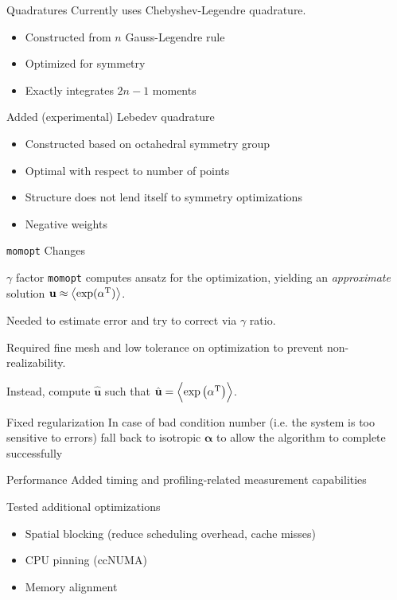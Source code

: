 \documentclass{beamer}
\renewcommand{\vec}[1]{\ensuremath{\mathbf{#1}}}
\newcommand{\integral}[1]{\ensuremath{\left\langle #1 \right\rangle}}
\newcommand{\T}[1]{\ensuremath{#1^\textnormal{T}}}
\newcommand{\momopt}{\texttt{momopt}\xspace}
\begin{document}
    \begin{frame}{Quadratures}
        Currently uses Chebyshev-Legendre quadrature.
        \begin{itemize}
            \item Constructed from $n$ Gauss-Legendre rule
            \item Optimized for symmetry
            \item Exactly integrates $2n - 1$ moments
        \end{itemize}

        \vfill

        Added (experimental) Lebedev quadrature
        \begin{itemize}
            \item Constructed based on octahedral symmetry group
            \item Optimal with respect to number of points
            \item Structure does not lend itself to symmetry optimizations
            \item Negative weights
        \end{itemize}
    \end{frame}

    \begin{frame}{\momopt Changes}
        \begin{block}{$\gamma$ factor}
            \momopt computes ansatz for the optimization, yielding an \emph{approximate} solution $\vec{u} \approx \integral{\exp (\T{\vec{\alpha}})}$.

            Needed to estimate error and try to correct via $\gamma$ ratio.

            Required fine mesh and low tolerance on optimization to prevent non-realizability.

            Instead, compute $\hat{\vec{u}}$ such that $\hat{\vec{u}} = \integral{\exp \left(\T{\vec{\alpha}}\right)}$.
        \end{block}

        \vfill

        \begin{block}{Fixed regularization}
            In case of bad condition number (i.e. the system is too sensitive to errors) fall back to isotropic \vec{\alpha} to allow the algorithm to complete successfully
        \end{block}
    \end{frame}

    \begin{frame}{Performance}
        Added timing and profiling-related measurement capabilities

        \vfill

        Tested additional optimizations
        \begin{itemize}
            \item Spatial blocking (reduce scheduling overhead, cache misses)
            \item CPU pinning (ccNUMA)
            \item Memory alignment
        \end{itemize}
    \end{frame}
\end{document}
